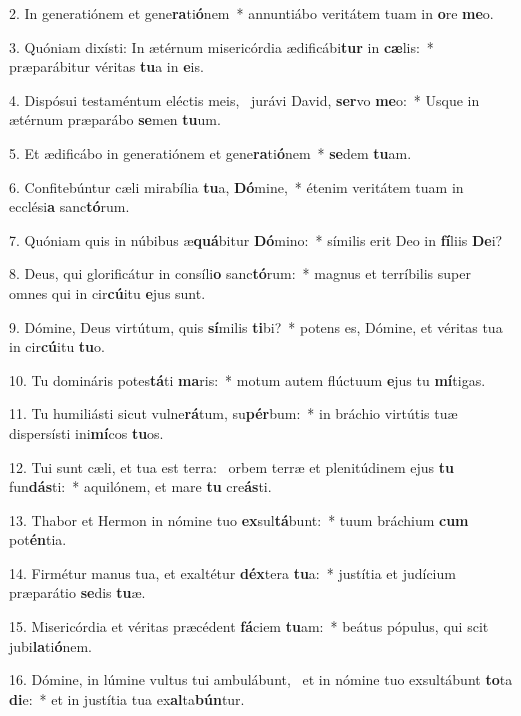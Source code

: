 2. In generatiónem et gene\textbf{ra}ti\textbf{ó}nem~*  annuntiábo veritátem tuam in \textbf{o}re \textbf{me}o.\

3. Quóniam dixísti: In ætérnum misericórdia ædificábi\textbf{tur} in \textbf{cæ}lis:~*  præparábitur véritas \textbf{tu}a in \textbf{e}is.\

4. Dispósui testaméntum eléctis meis, \dag\  jurávi David, \textbf{ser}vo \textbf{me}o:~*  Usque in ætérnum præparábo \textbf{se}men \textbf{tu}um.\

5. Et ædificábo in generatiónem et gene\textbf{ra}ti\textbf{ó}nem~*  \textbf{se}dem \textbf{tu}am.\

6. Confitebúntur cæli mirabília \textbf{tu}a, \textbf{Dó}mine,~*  étenim veritátem tuam in ecclési\textbf{a} sanc\textbf{tó}rum.\

7. Quóniam quis in núbibus æ\textbf{quá}bitur \textbf{Dó}mino:~*  símilis erit Deo in \textbf{fí}liis \textbf{De}i?\

8. Deus, qui glorificátur in consíli\textbf{o} sanc\textbf{tó}rum:~*  magnus et terríbilis super omnes qui in cir\textbf{cú}itu \textbf{e}jus sunt.\

9. Dómine, Deus virtútum, quis \textbf{sí}milis \textbf{ti}bi?~*  potens es, Dómine, et véritas tua in cir\textbf{cú}itu \textbf{tu}o.\

10. Tu domináris potes\textbf{tá}ti \textbf{ma}ris:~*  motum autem flúctuum \textbf{e}jus tu \textbf{mí}tigas.\

11. Tu humiliásti sicut vulne\textbf{rá}tum, su\textbf{pér}bum:~*  in bráchio virtútis tuæ dispersísti ini\textbf{mí}cos \textbf{tu}os.\

12. Tui sunt cæli, et tua est terra: \dag\  orbem terræ et plenitúdinem ejus \textbf{tu} fun\textbf{dás}ti:~*  aquilónem, et mare \textbf{tu} cre\textbf{ás}ti.\

13. Thabor et Hermon in nómine tuo \textbf{ex}sul\textbf{tá}bunt:~*  tuum bráchium \textbf{cum} pot\textbf{én}tia.\

14. Firmétur manus tua, et exaltétur \textbf{déx}tera \textbf{tu}a:~*  justítia et judícium præparátio \textbf{se}dis \textbf{tu}æ.\

15. Misericórdia et véritas præcédent \textbf{fá}ciem \textbf{tu}am:~*  beátus pópulus, qui scit jubi\textbf{la}ti\textbf{ó}nem.\

16. Dómine, in lúmine vultus tui ambulábunt, \dag\  et in nómine tuo exsultábunt \textbf{to}ta \textbf{di}e:~*  et in justítia tua ex\textbf{al}ta\textbf{bún}tur.\

